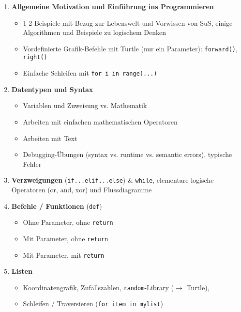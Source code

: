 \begin{overviewBox}[title=Überblick der Themen]
    \begin{enumerate}
    \item \textbf{Allgemeine Motivation und Einführung ins Programmieren}
    \begin{itemize}
        \item 1-2 Beispiele mit Bezug zur Lebenswelt und Vorwissen von SuS, einige Algorithmen und Beispiele zu logischem Denken
        \item Vordefinierte Grafik-Befehle mit Turtle (nur ein Parameter): \lstinline|forward()|, \lstinline|right()|
        \item Einfache Schleifen mit \lstinline|for i in range(...)|
    \end{itemize}
    \item \textbf{Datentypen und Syntax}
    \begin{itemize}
        \item Variablen und Zuweisung vs. Mathematik
        \item Arbeiten mit einfachen mathematischen Operatoren
        \item Arbeiten mit Text
        \item Debugging-Übungen (syntax vs. runtime vs. semantic errors), typische Fehler
    \end{itemize}
    \item \textbf{Verzweigungen} (\lstinline|if...elif...else|) \& \lstinline|while|,  elementare logische Operatoren (or, and, xor)  und Flussdiagramme
    \item \textbf{Befehle / Funktionen} (\lstinline|def|)
    \begin{itemize}
        \item Ohne Parameter, ohne \lstinline|return|
        \item Mit Parameter, ohne \lstinline|return|
        \item Mit Parameter, mit \lstinline|return|
    \end{itemize}
    \item \textbf{Listen}
    \begin{itemize}
        \item  Koordinatengrafik, Zufallszahlen, \lstinline|random|-Library ($\rightarrow$ Turtle), \item Schleifen / Traversieren (\lstinline|for item in mylist|)
    \end{itemize}
\end{enumerate}
\end{overviewBox}

